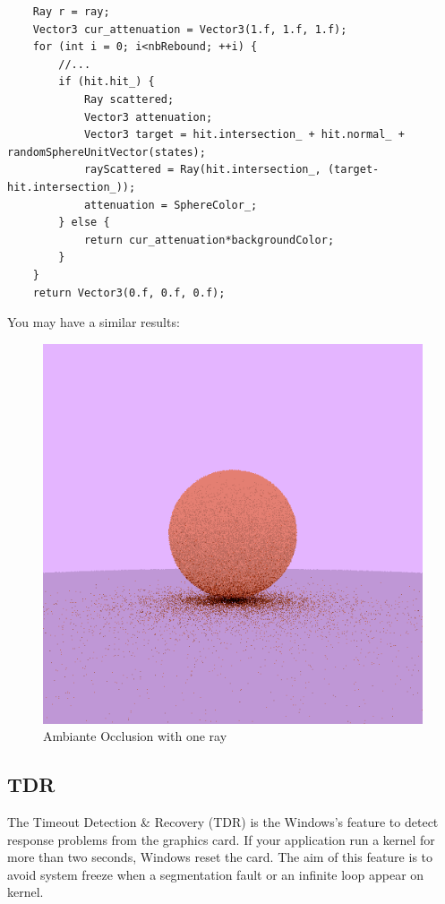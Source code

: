 \documentclass{article}
\begin{document}
\begin{lstlisting}
	Ray r = ray;
	Vector3 cur_attenuation = Vector3(1.f, 1.f, 1.f);
	for (int i = 0; i<nbRebound; ++i) {
		//...
		if (hit.hit_) {
			Ray scattered;
			Vector3 attenuation;
			Vector3 target = hit.intersection_ + hit.normal_ + randomSphereUnitVector(states);
			rayScattered = Ray(hit.intersection_, (target-hit.intersection_));
			attenuation = SphereColor_;
		} else {
			return cur_attenuation*backgroundColor;
		}
	}
	return Vector3(0.f, 0.f, 0.f);
\end{lstlisting}
You may have a similar results:
\begin{figure}[h]
	\centering
	\includegraphics[scale=0.47]{figures/oneRay.png}
	\caption{Ambiante Occlusion with one ray}
\end{figure}

\subsection{TDR}
The Timeout Detection \& Recovery (TDR) is the Windows's feature to detect response problems from the graphics card. If your application run a kernel for more than two seconds, Windows reset the card. The aim of this feature is to avoid system freeze when a segmentation fault or an infinite loop appear on kernel.\\
\end{document}
